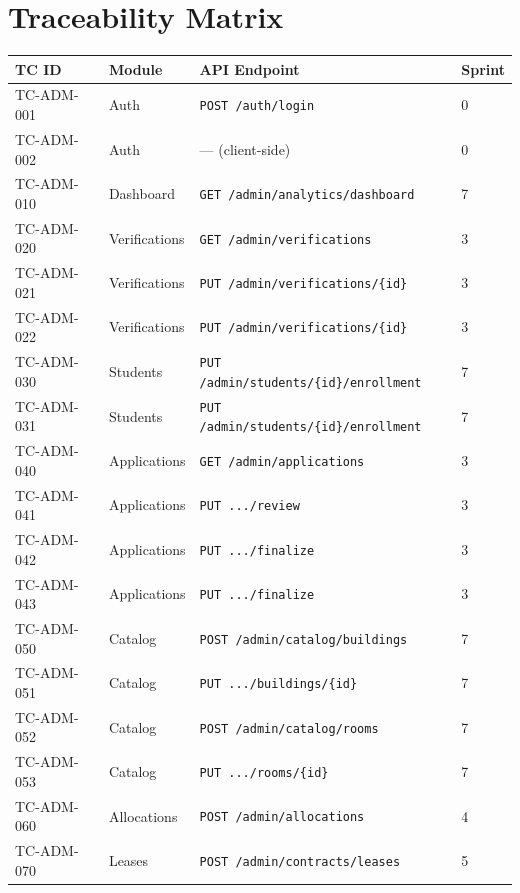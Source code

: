 \documentclass[12pt,a4paper]{article}
\begin{document}
\section{Traceability Matrix}

\begin{longtable}{L{2.5cm} L{4cm} L{6cm} L{2cm}}
\toprule
\textbf{TC ID} & \textbf{Module} & \textbf{API Endpoint} & \textbf{Sprint} \\
\midrule
\endfirsthead \midrule \endhead \bottomrule \endfoot

TC-ADM-001 & Auth & \texttt{POST /auth/login} & 0 \\
TC-ADM-002 & Auth & --- (client-side) & 0 \\
TC-ADM-010 & Dashboard & \texttt{GET /admin/analytics/dashboard} & 7 \\
TC-ADM-020 & Verifications & \texttt{GET /admin/verifications} & 3 \\
TC-ADM-021 & Verifications & \texttt{PUT /admin/verifications/\{id\}} & 3 \\
TC-ADM-022 & Verifications & \texttt{PUT /admin/verifications/\{id\}} & 3 \\
TC-ADM-030 & Students & \texttt{PUT /admin/students/\{id\}/enrollment} & 7 \\
TC-ADM-031 & Students & \texttt{PUT /admin/students/\{id\}/enrollment} & 7 \\
TC-ADM-040 & Applications & \texttt{GET /admin/applications} & 3 \\
TC-ADM-041 & Applications & \texttt{PUT .../review} & 3 \\
TC-ADM-042 & Applications & \texttt{PUT .../finalize} & 3 \\
TC-ADM-043 & Applications & \texttt{PUT .../finalize} & 3 \\
TC-ADM-050 & Catalog & \texttt{POST /admin/catalog/buildings} & 7 \\
TC-ADM-051 & Catalog & \texttt{PUT .../buildings/\{id\}} & 7 \\
TC-ADM-052 & Catalog & \texttt{POST /admin/catalog/rooms} & 7 \\
TC-ADM-053 & Catalog & \texttt{PUT .../rooms/\{id\}} & 7 \\
TC-ADM-060 & Allocations & \texttt{POST /admin/allocations} & 4 \\
TC-ADM-070 & Leases & \texttt{POST /admin/contracts/leases} & 5 \\

\end{longtable}
\end{document}
